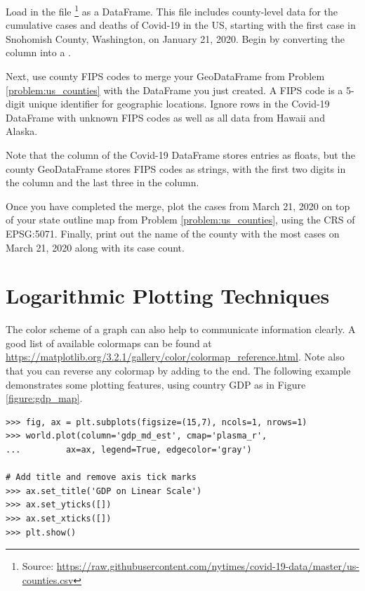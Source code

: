\begin{problem}
Load in the file \footnote{Source: \url{https://raw.githubusercontent.com/nytimes/covid-19-data/master/us-counties.csv}} as a DataFrame.
This file includes county-level data for the cumulative cases and deaths of Covid-19 in the US, starting with the first case in Snohomish County, Washington, on January 21, 2020.
Begin by converting the  column into a .

Next, use county FIPS codes to merge your GeoDataFrame from Problem \ref{problem:us_counties} with the DataFrame you just created.
A FIPS code is a 5-digit unique identifier for geographic locations.
Ignore rows in the Covid-19 DataFrame with unknown FIPS codes as well as all data from Hawaii and Alaska.

Note that the  column of the Covid-19 DataFrame stores entries as floats, but the county GeoDataFrame stores FIPS codes as strings, with the first two digits in the  column and the last three in the  column.

Once you have completed the merge, plot the cases from March 21, 2020 on top of your state outline map from Problem \ref{problem:us_counties}, using the CRS of EPSG:5071.
Finally, print out the name of the county with the most cases on March 21, 2020 along with its case count.
\label{problem:merge_covid}
\end{problem}

\section*{Logarithmic Plotting Techniques} %

The color scheme of a graph can also help to communicate information clearly.
A good list of available colormaps can be found at \url{https://matplotlib.org/3.2.1/gallery/color/colormap_reference.html}.
Note also that you can reverse any colormap by adding  to the end.
The following example demonstrates some plotting features, using country GDP as in Figure \ref{figure:gdp_map}.

\begin{lstlisting}
>>> fig, ax = plt.subplots(figsize=(15,7), ncols=1, nrows=1)
>>> world.plot(column='gdp_md_est', cmap='plasma_r',
...			ax=ax, legend=True, edgecolor='gray')

# Add title and remove axis tick marks
>>> ax.set_title('GDP on Linear Scale')
>>> ax.set_yticks([])
>>> ax.set_xticks([])
>>> plt.show()
\end{lstlisting}

